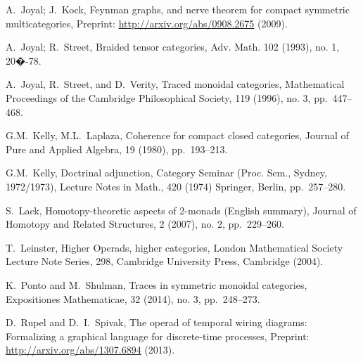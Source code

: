 \documentclass[11pt,oneside,article]{memoir}
\begin{document}
\begin{thebibliography}{XXX}
 A.~Joyal; J.~Kock, Feynman graphs, and nerve theorem for compact symmetric multicategories, Preprint: \url{http://arxiv.org/abs/0908.2675} (2009).

 A.~Joyal; R.~Street, Braided tensor categories, Adv. Math. 102 (1993), no. 1, 20�-78.

 A.~Joyal, R.~Street, and D.~Verity, Traced monoidal categories, Mathematical Proceedings of the Cambridge Philosophical Society, 119 (1996), no. 3, pp.~447--468.

 G.M.~Kelly, M.L.~Laplaza, Coherence for compact closed categories, Journal of Pure and Applied Algebra, 19 (1980), pp.~193--213.

 G.M.~Kelly, Doctrinal adjunction, Category Seminar (Proc. Sem., Sydney, 1972/1973), Lecture Notes in Math., 420 (1974) Springer, Berlin, pp.~257--280.



 S.~Lack, Homotopy-theoretic aspects of 2-monads (English summary), Journal of Homotopy and Related Structures, 2 (2007), no. 2, pp.~229--260.

 T.~Leinster, Higher Operads, higher categories, London Mathematical Society Lecture Note Series, 298, Cambridge University Press, Cambridge (2004).




 K.~Ponto and M.~Shulman, Traces in symmetric monoidal categories, Expositiones Mathematicae, 32 (2014), no. 3, pp.~248--273.

 D.~Rupel and D.~I.~Spivak, The operad of temporal wiring diagrams: Formalizing a graphical language for discrete-time processes, Preprint: \url{http://arxiv.org/abs/1307.6894} (2013).


\end{thebibliography}
\end{document}
